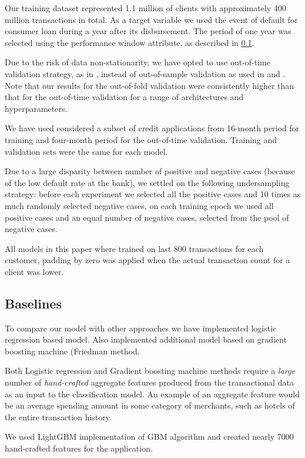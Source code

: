 \documentclass[sigconf]{acmart}
\begin{document}
Our training dataset represented 1.1 million of clients with approximately 400 million transactions in total. As a target variable we used the event of default for consumer loan during a year after its disbursement. The period of one year was selected using the performance window attribute, as described in \ref{}.

Due to the risk of data non-stationarity, we have opted to use out-of-time validation strategy, as in \cite{KVAMME2018207}, instead of out-of-sample validation as used in \cite{khandani2010consumer} and \cite{bellotti2013forecasting}. Note that our results for the out-of-fold validation were consistently higher than that for the out-of-time validation for a range of architectures and hyperparameters.

We have used considered a subset of credit applications from 16-month period for training and four-month period for the out-of-time validation. Training and validation sets were the same for each model.

Due to a large disparity between number of positive and negative cases (because of the low default rate at the bank), we settled on the following undersampling strategy: before each experiment we selected all the positive cases and 10 times as much randomly selected negative cases, on each training epoch we used all positive cases and an equal number of negative cases, selected from the pool of negative cases.

All models in this paper where trained on last 800 transactions for each customer, padding by zero was applied when the actual transaction count for a client was lower.

\subsection{Baselines}

To compare our model with other approaches we have implemented logistic regression based model. Also implemented additional model based on gradient boosting machine (Friedman\cite{friedman2001greedy} method.

Both Logistic regression and Gradient boosting machine methods require a \textit{large} number of \textit{hand-crafted} aggregate features produced from the transactional data as an input to the classification model. An example of an aggregate feature would be an average spending amount in some category of merchants, such as hotels of the entire transaction history.

We used LightGBM\cite{Ke2017LightGBMAH} implementation of GBM algorithm and created nearly 7000 hand-crafted features for the application.
\end{document}

